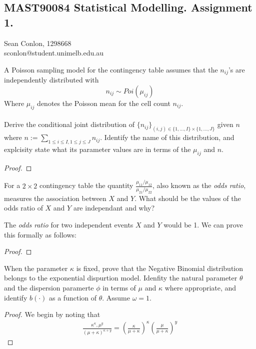 \documentclass[nocolor]{report}
\begin{document}
    \newpage
    \subsection*{\hspace{10mm} MAST90084 Statistical Modelling. Assignment 1.}
\begin{center}
    Sean Conlon, 1298668 \\
    sconlon@student.unimelb.edu.au
\end{center}


\begin{ex}[Question 1a] A Poisson sampling model for the contingency table assumes that the $n_{ij}$’s are independently distributed with
$$n_{ij}\sim Poi(\mu_{ij})$$
Where $\mu_{ij}$ denotes the Poisson mean for the cell count $n_{ij}$. \\
\\
Derive the conditional joint distribution of $\{n_{ij}\}_{(i,j)\in\{1,\dots,I\}\times\{1,\dots,J\}}$ given $n$ where $n:=\sum_{1\leq i\leq I, 1\leq j\leq J}n_{ij}$. Identify the name of this distribution, and explcisity state what its parameter values are in terms of the $\mu_{ij}$ and $n$.
\end{ex}
\vspace{-10pt}
\begin{soln}
    
\end{soln}
\begin{proof}

\end{proof}

\begin{ex}[Question 1b] For a $2\times 2$ contingency table the quantity $\frac{\mu_{11}/\mu_{12}}{\mu_{21}/\mu_{22}}$, also known as the \textit{odds ratio}, measures the association between $X$ and $Y$. What should be the values of the odds ratio of $X$ and $Y$ are independant and why?
\end{ex}
\vspace{-10pt}
\begin{soln}
    The \textit{odds ratio} for two independent events $X$ and $Y$ would be 1. We can prove this formally as follows:
\end{soln}
\begin{proof}

\end{proof}


\begin{ex}[Question 3a] When the parameter $\kappa$ is fixed, prove that the Negative Binomial distribution belongs to the exponential dispurtion model. Idenfity the natural parameter $\theta$ and the dispersion paramerte $\phi$ in terms of $\mu$ and $\kappa$ where appropriate, and identify $b(\cdot)$ as a function of $\theta$. Assume $\omega = 1$.
\end{ex}
\begin{proof}
    We begin by noting that 
    \begin{align*}
        \frac{\kappa^\kappa, \mu^y}{(\mu+\kappa)^{\kappa + y}} = \left(\frac{\kappa}{\mu+\kappa}\right)^\kappa \left(\frac{\mu}{\mu+\kappa}\right)^y
    \end{align*}
\end{proof}
\end{document}
